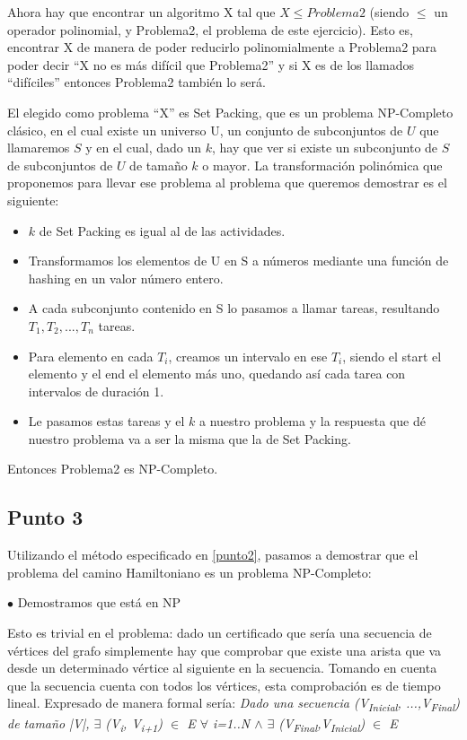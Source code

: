 \documentclass[a4paper,10pt]{article}
\begin{document}
	Ahora hay que encontrar un algoritmo X tal que $X \leq Problema2$ (siendo $\leq$ un operador polinomial, y Problema2, el problema de este ejercicio). Esto es, encontrar X de manera de poder reducirlo polinomialmente a Problema2 para poder decir ``X no es más difícil que Problema2'' y si X es de los llamados “difíciles” entonces Problema2 también lo será.

	El elegido como problema ``X'' es Set Packing, que es un problema NP-Completo clásico, en el cual existe un universo U, un conjunto de subconjuntos de $U$ que llamaremos $S$ y en el cual, dado un $k$, hay que ver si existe un subconjunto de $S$ de subconjuntos de $U$ de tamaño $k$ o mayor. La transformación polinómica que proponemos para llevar ese problema al problema que queremos demostrar es el siguiente:
	\begin{itemize}
		\item $k$ de Set Packing es igual al de las actividades.
		\item Transformamos los elementos de U en S a números mediante una función de hashing en un valor número entero.
		\item A cada subconjunto contenido en S lo pasamos a llamar tareas, resultando $T_1, T_2, ..., T_n$ tareas.
		\item Para elemento en cada $T_i$, creamos un intervalo en ese $T_i$, siendo el start el elemento y el end el elemento más uno, quedando así cada tarea con intervalos de duración 1.
		\item Le pasamos estas tareas y el $k$ a nuestro problema y la respuesta que dé nuestro problema va a ser la misma que la de Set Packing.
	\end{itemize}

	Entonces Problema2 es NP-Completo.

\subsection{Punto 3}
	Utilizando el método especificado en \ref{punto2}, pasamos a demostrar que el problema del camino Hamiltoniano es un problema NP-Completo:

	$\bullet$ Demostramos que está en NP

	Esto es trivial en el problema: dado un certificado que sería una secuencia de vértices del grafo simplemente hay que comprobar que existe una arista que va desde un determinado vértice al siguiente en la secuencia. Tomando en cuenta que la secuencia cuenta con todos los vértices, esta comprobación es de tiempo lineal. Expresado de manera formal sería:
	\emph{Dado  una secuencia (V\textsubscript{Inicial}, ...,V\textsubscript{Final}) de tamaño |V|, $\exists$ (V\textsubscript{i}, V\textsubscript{i+1}) $\in$ E $\forall$ i=1..N $\wedge$ $\exists$ (V\textsubscript{Final},V\textsubscript{Inicial}) $\in$ E } \\
\end{document}

